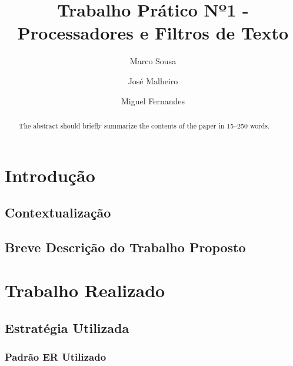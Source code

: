 \documentclass[runningheads]{llncs}
\begin{document}
%
\title{Trabalho Prático Nº1 - Processadores e Filtros de Texto}
%
%
\author{Marco Sousa \and
José Malheiro \and
Miguel Fernandes}
%
%
\maketitle              %
%
\begin{abstract}
The abstract should briefly summarize the contents of the paper in
15--250 words.

\end{abstract}
%
%
%
\section{Introdução}
\subsection{Contextualização} 



\subsection{Breve Descrição do Trabalho Proposto}



\section{Trabalho Realizado} 

\subsection{Estratégia Utilizada} \label{subsec:strat}



\subsubsection{Padrão ER Utilizado} \label{subsubsec:padrao}
\end{document}
